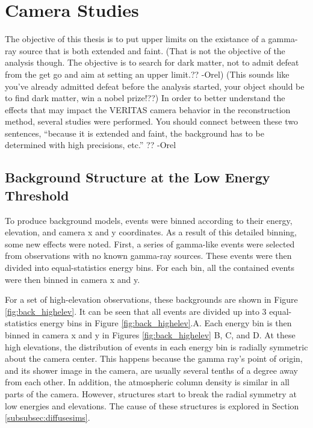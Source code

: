   \FloatBarrier

\section{Camera Studies}
  The objective of this thesis is to put upper limits on the existance of a gamma-ray source that is both extended and faint.
  {\color{red}(That is not the objective of the analysis though. The objective is to search for dark matter, not to admit defeat from the get go and aim at setting an upper limit.?? -Orel) (This sounds like you've already admitted defeat before the analysis started, your object should be to find dark matter, win a nobel prize!??)}
  In order to better understand the effects that may impact the VERITAS camera behavior in the reconstruction method, several studies were performed.
  {\color{red} You should connect between these two sentences, “because it is extended and faint, the background has to be determined with high precisions, etc.” ?? -Orel}

  \subsection{Background Structure at the Low Energy Threshold}
    To produce background models, events were binned according to their energy, elevation, and camera x and y coordinates.
    As a result of this detailed binning, some new effects were noted.
    First, a series of gamma-like events were selected from observations with no known gamma-ray sources.
    These events were then divided into equal-statistics energy bins.
    For each bin, all the contained events were then binned in camera x and y.

    For a set of high-elevation observations, these backgrounds are shown in Figure \ref{fig:back_highelev}.
    It can be seen that all events are divided up into 3 equal-statistics energy bins in Figure \ref{fig:back_highelev}.A.
    Each energy bin is then binned in camera x and y in Figures \ref{fig:back_highelev} B, C, and D.
    At these high elevations, the distribution of events in each energy bin is radially symmetric about the camera center.
    This happens because the gamma ray's point of origin, and its shower image in the camera, are usually several tenths of a degree away from each other.
    In addition, the atmospheric column density is similar in all parts of the camera.
    However, structures start to break the radial symmetry at low energies and elevations.
    The cause of these structures is explored in Section \ref{subsubsec:diffusesims}.


